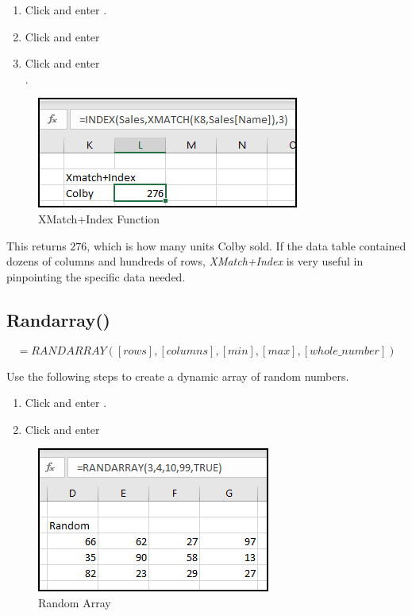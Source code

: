 \begin{enumbox}
	\begin{enumerate}
		\item Click  and enter .
		\item Click  and enter 
		\item Click  and enter \\ .
	\end{enumerate}
\end{enumbox}

\begin{figure}[H]
	\centering
	\includegraphics[width=\maxwidth{.65\linewidth}]{gfx/apb_fig07}
	\caption{XMatch+Index Function}
	\label{apb:fig07}
\end{figure}

This returns $ 276 $, which is how many units Colby sold. If the data table contained dozens of columns and hundreds of rows, \textit{XMatch+Index} is very useful in pinpointing the specific data needed.

\subsection{Randarray()}

\[ =RANDARRAY([rows],[columns],[min],[max],[whole\_number]) \]

Use the following steps to create a dynamic array of random numbers.

\begin{enumbox}
	\begin{enumerate}
		\item Click  and enter .
		\item Click  and enter 
	\end{enumerate}
\end{enumbox}

\begin{figure}[H]
	\centering
	\includegraphics[width=\maxwidth{.65\linewidth}]{gfx/apb_fig08}
	\caption{Random Array}
	\label{apb:fig08}
\end{figure}


